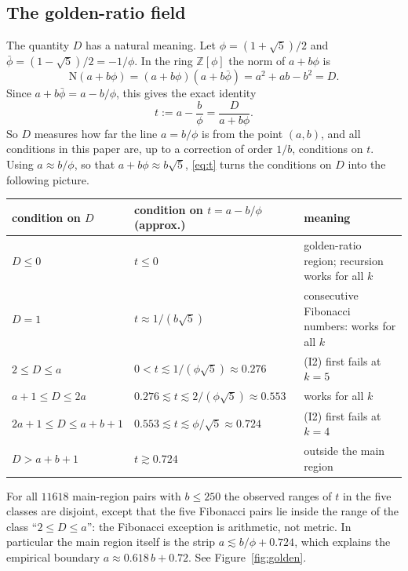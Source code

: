 \documentclass[11pt,a4paper]{article}
\theoremstyle{definition}
\theoremstyle{remark}
\begin{document}
\subsection{The golden-ratio field}\label{sec:norm}
The quantity $D$ has a natural meaning. Let $\phi=(1+\sqrt5)/2$ and $\bar\phi=(1-\sqrt5)/2=-1/\phi$. In the ring $\mathbb Z[\phi]$ the norm of $a+b\phi$ is
\[
  \mathrm{N}(a+b\phi)=(a+b\phi)(a+b\bar\phi)=a^2+ab-b^2=D .
\]
Since $a+b\bar\phi=a-b/\phi$, this gives the exact identity
\begin{equation}\label{eq:t}
  t:=a-\frac b\phi=\frac{D}{a+b\phi}.
\end{equation}
So $D$ measures how far the line $a=b/\phi$ is from the point $(a,b)$, and all conditions in this paper are, up to a correction of order $1/b$, conditions on $t$. Using $a\approx b/\phi$, so that $a+b\phi\approx b\sqrt5$, \eqref{eq:t} turns the conditions on $D$ into the following picture.
\begin{center}
\renewcommand{\arraystretch}{1.2}
\small
\begin{tabular}{ll>{\raggedright\arraybackslash}p{5.4cm}}
\toprule
condition on $D$ & condition on $t=a-b/\phi$ (approx.) & meaning\\
\midrule
$D\le0$ & $t\le0$ & golden-ratio region; recursion works for all $k$\\
$D=1$ & $t\approx 1/(b\sqrt5)$ & consecutive Fibonacci numbers: works for all $k$\\
$2\le D\le a$ & $0<t\lesssim 1/(\phi\sqrt5)\approx0.276$ & (I2) first fails at $k=5$\\
$a+1\le D\le 2a$ & $0.276\lesssim t\lesssim 2/(\phi\sqrt5)\approx0.553$ & works for all $k$\\
$2a+1\le D\le a+b+1$ & $0.553\lesssim t\lesssim \phi/\sqrt5\approx0.724$ & (I2) first fails at $k=4$\\
$D>a+b+1$ & $t\gtrsim0.724$ & outside the main region\\
\bottomrule
\end{tabular}
\end{center}
For all $11618$ main-region pairs with $b\le250$ the observed ranges of $t$ in the five classes are disjoint, except that the five Fibonacci pairs lie inside the range of the class ``$2\le D\le a$'': the Fibonacci exception is arithmetic, not metric. In particular the main region itself is the strip $a\lesssim b/\phi+0.724$, which explains the empirical boundary $a\approx0.618\,b+0.72$. See Figure~\ref{fig:golden}.
\end{document}
